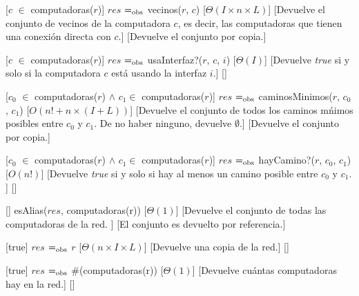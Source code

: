 \begin{Interfaz}
  [$c$ $\in$ computadoras($r$)] %
  {$res$ $=_{\mathrm{obs}}$ vecinos($r$, $c$)} %
  [$\Theta(I \times n \times L)$] %
  [Devuelve el conjunto de vecinos de la computadora $c$, es decir, las computadoras que tienen una conexi\'on directa con $c$.] %
  [Devuelve el conjunto por copia.] %
  
  [$c$ $\in$ computadoras($r$)] %
  {$res$ $=_{\mathrm{obs}}$ usaInterfaz?($r$, $c$, $i$)} %
  [$\Theta(I)$] %
  [Devuelve \emph{true} si y solo si la computadora $c$ est\'a usando la interfaz $i$.] %
  [] %
  
  [$c_{0}$ $\in$ computadoras($r$) $\land$ $c_{1} \in $ computadoras($r$)] %
  {$res$ $=_{\mathrm{obs}}$ caminosMinimos($r$, $c_{0}$, $c_{1}$)} %
  [$O(n! + n \times (I + L))$] %
  [Devuelve el conjunto de todos los caminos m\'nimos posibles entre $c_{0}$ y $c_{1}$. De no haber ninguno, devuelve $\emptyset$.] %
  [Devuelve el conjunto por copia.] %
  
  [$c_{0}$ $\in$ computadoras($r$) $\land$ $c_{1} \in $ computadoras($r$)] %
  {$res$ $=_{\mathrm{obs}}$ hayCamino?($r$, $c_{0}$, $c_{1}$)} %
  [$O(n!)$] %
  [Devuelve \emph{true} si y solo si hay al menos un camino posible entre $c_{0}$ y $c_{1}$. ] %
  [] %

  [] %
  {esAlias($res$, computadoras(r))} %
  [$\Theta(1)$] %
  [Devuelve el conjunto de todas las computadoras de la red. ] %
  [El conjunto es devuelto por referencia.] %

  [true] %
  {$res$ $=_{\mathrm{obs}}$ $r$} %
  [$\Theta(n \times I \times L)$] %
  [Devuelve una copia de la red.] %
  [] %
  
  [true] %
  {$res$ $=_{\mathrm{obs}}$ \#(computadoras(r))} %
  [$\Theta(1)$] %
  [Devuelve cu\'antas computadoras hay en la red.] %
  [] %

\end{Interfaz}


